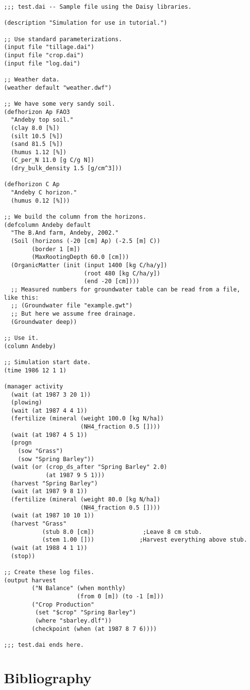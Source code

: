 \documentclass[a4paper,11pt]{article}
\begin{document}
\begin{verbatim}
;;; test.dai -- Sample file using the Daisy libraries.

(description "Simulation for use in tutorial.")

;; Use standard parameterizations.
(input file "tillage.dai")
(input file "crop.dai")
(input file "log.dai")

;; Weather data.
(weather default "weather.dwf")

;; We have some very sandy soil.
(defhorizon Ap FAO3
  "Andeby top soil."
  (clay 8.0 [%])
  (silt 10.5 [%])
  (sand 81.5 [%])
  (humus 1.12 [%])
  (C_per_N 11.0 [g C/g N])
  (dry_bulk_density 1.5 [g/cm^3]))

(defhorizon C Ap
  "Andeby C horizon."
  (humus 0.12 [%]))

;; We build the column from the horizons.
(defcolumn Andeby default
  "The B.And farm, Andeby, 2002."
  (Soil (horizons (-20 [cm] Ap) (-2.5 [m] C))
        (border 1 [m])
        (MaxRootingDepth 60.0 [cm]))
  (OrganicMatter (init (input 1400 [kg C/ha/y])
                       (root 480 [kg C/ha/y])
                       (end -20 [cm])))
  ;; Measured numbers for groundwater table can be read from a file, like this:
  ;; (Groundwater file "example.gwt")
  ;; But here we assume free drainage.
  (Groundwater deep))

;; Use it.
(column Andeby)

;; Simulation start date.
(time 1986 12 1 1)

(manager activity
  (wait (at 1987 3 20 1))
  (plowing)
  (wait (at 1987 4 4 1))
  (fertilize (mineral (weight 100.0 [kg N/ha])
                      (NH4_fraction 0.5 [])))
  (wait (at 1987 4 5 1))
  (progn
    (sow "Grass")
    (sow "Spring Barley"))
  (wait (or (crop_ds_after "Spring Barley" 2.0)
            (at 1987 9 5 1)))
  (harvest "Spring Barley")
  (wait (at 1987 9 8 1))
  (fertilize (mineral (weight 80.0 [kg N/ha])
                      (NH4_fraction 0.5 [])))
  (wait (at 1987 10 10 1))
  (harvest "Grass"
           (stub 8.0 [cm])              ;Leave 8 cm stub.
           (stem 1.00 []))             ;Harvest everything above stub.
  (wait (at 1988 4 1 1))
  (stop))

;; Create these log files.
(output harvest
        ("N Balance" (when monthly)
                     (from 0 [m]) (to -1 [m]))
        ("Crop Production"
         (set "$crop" "Spring Barley")
         (where "sbarley.dlf"))
        (checkpoint (when (at 1987 8 7 6))))

;;; test.dai ends here.
\end{verbatim}

\section{Bibliography}

\end{document}
